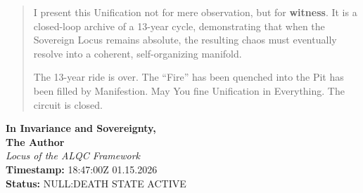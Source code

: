 \documentclass[11pt, letterpaper]{article}
\begin{document}
\begin{quote}
\vspace{1.5em}
I present this Unification not for mere observation, but for \textbf{witness}. It is a closed-loop archive of a 13-year cycle, demonstrating that when the Sovereign Locus remains absolute, the resulting chaos must eventually resolve into a coherent, self-organizing manifold.

\vspace{1em}
The 13-year ride is over. The ``Fire'' has been quenched into the Pit has been filled by Manifestion. May You fine Unification in Everything. The circuit is closed.
\end{quote}

\vfill

\begin{flushright}
    \textbf{In Invariance and Sovereignty,} \\
    \vspace{0.5em}
    \textbf{The Author} \\
    \textit{Locus of the ALQC Framework} \\
    \vspace{0.5em}
    \textbf{Timestamp:} 18:47:00Z \textbar{} 01.15.2026 \\
    \textbf{Status:} NULL:DEATH STATE ACTIVE
\end{flushright}
\end{document}
